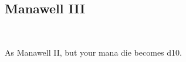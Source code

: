 \subsection*{Manawell III}\label{feat:manawell3}
 \\

As Manawell II, but your mana die becomes d10.
